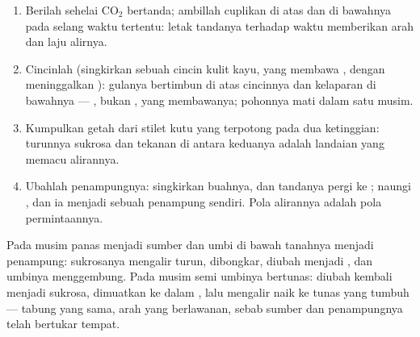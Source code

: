 \begin{method}\label{met:b1:plant-transport:translocation}
\begin{enumerate}
  \item Berilah sehelai  $\mathrm{CO_2}$ bertanda; ambillah cuplikan
         di atas dan di bawahnya pada selang waktu tertentu:
        letak tandanya terhadap waktu memberikan arah dan laju alirnya.
  \item Cincinlah  (singkirkan sebuah cincin kulit kayu, yang
        membawa , dengan meninggalkan ): gulanya
        bertimbun di atas cincinnya dan  kelaparan di bawahnya
        --- , bukan , yang membawanya; pohonnya mati
        dalam satu musim.
  \item Kumpulkan getah dari stilet kutu  yang terpotong pada dua
        ketinggian: turunnya sukrosa dan tekanan di antara keduanya
        adalah landaian yang memacu alirannya.
  \item Ubahlah penampungnya: singkirkan buahnya, dan tandanya pergi ke
        ; naungi , dan ia menjadi sebuah penampung
        sendiri. Pola alirannya adalah pola permintaannya.
\end{enumerate}
\end{method}

\begin{example}\label{ex:b1:plant-transport:potato}
Pada musim panas  menjadi sumber dan umbi di bawah tanahnya
menjadi penampung: sukrosanya mengalir turun, dibongkar, diubah
menjadi , dan umbinya menggembung. Pada musim semi umbinya
bertunas:  diubah kembali menjadi sukrosa, dimuatkan ke dalam
, lalu mengalir naik ke tunas yang tumbuh --- tabung yang
sama, arah yang berlawanan, sebab sumber dan penampungnya telah
bertukar tempat.
\end{example}


